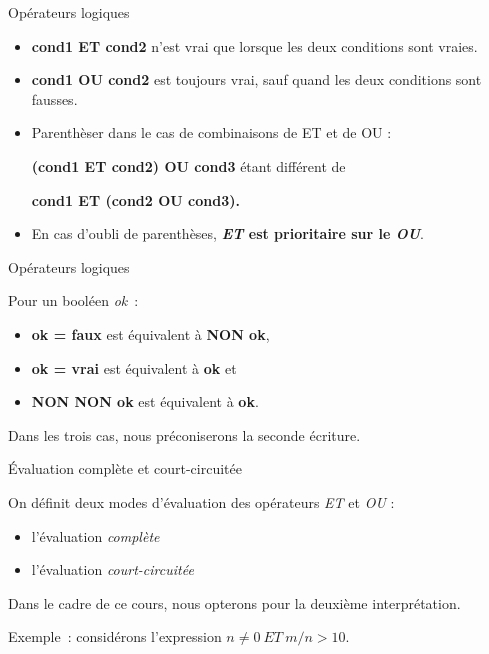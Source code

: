 \begin{frame}{Opérateurs logiques}
	\begin{itemize}
	\item
	\textbf{cond1 ET cond2} n’est vrai que lorsque
	les deux conditions sont vraies. 
	
	\item
	\textbf{cond1 OU cond2} est
	toujours vrai, sauf quand les deux conditions sont fausses.

	\item
	Parenthèser dans le cas de combinaisons de ET et de
	OU : 
	
	\textbf{(cond1 ET cond2) OU cond3} étant différent de
	
	\textbf{cond1 ET (cond2 OU cond3).} 
	
	\item
	En cas d'oubli de parenthèses,
	\textbf{\textit{ET} est prioritaire sur le \textit{OU}}.
	\end{itemize}
\end{frame}

\begin{frame}{Opérateurs logiques}

	Pour un booléen \textit{ok}~: 
	
	\begin{itemize}
	\item
	\textbf{ok = faux} est équivalent à \textbf{NON ok},
	\item
	\textbf{ok = vrai} est équivalent à \textbf{ok} et 
	\item
	\textbf{NON NON ok} est équivalent à \textbf{ok}.
	\end{itemize}
	Dans les trois cas, nous préconiserons la seconde écriture.
\end{frame}

\begin{frame}{Évaluation complète et court-circuitée}

	On définit deux modes d’évaluation des opérateurs \textit{ET}
	et \textit{OU} :

	\begin{itemize}
	\item{l’évaluation \textit{complète}}
	\item{l’évaluation \textit{court-circuitée}}
	\end{itemize}
	Dans le cadre de ce cours, nous opterons pour la deuxième 
	interprétation.
	
	\bigskip
	
	Exemple~: considérons	l’expression 
		{$n {\neq} 0 \ ET \  m/n > 10$}.
\end{frame}
		
